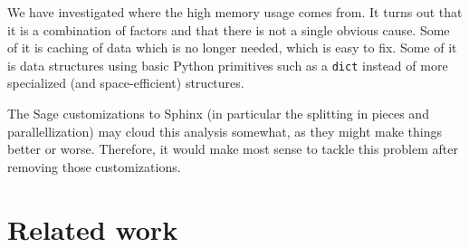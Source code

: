 \documentclass{deliverablereport}
\begin{document}

We have investigated where the high memory usage comes from.
It turns out that it is a combination of factors
and that there is not a single obvious cause.
Some of it is caching of data which is no longer needed,
which is easy to fix.
Some of it is data structures using basic Python primitives such as a \texttt{dict}
instead of more specialized (and space-efficient) structures.

The Sage customizations to Sphinx
(in particular the splitting in pieces and parallellization)
may cloud this analysis somewhat,
as they might make things better or worse.
Therefore, it would make most sense to tackle this problem after
removing those customizations.

\section{Related work}



\end{document}
